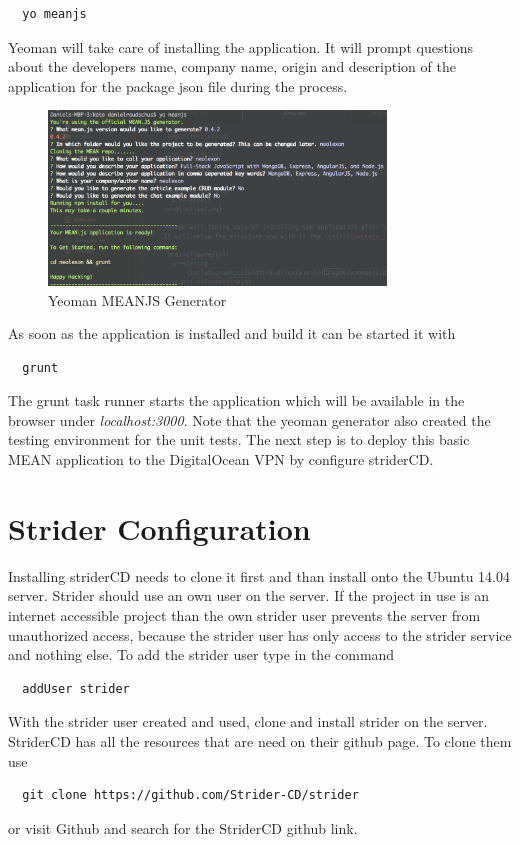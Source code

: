 \begin{lstlisting}
  yo meanjs
\end{lstlisting}

Yeoman will take care of installing the application. It will prompt questions about the developers name, company name, origin and description of the application
for the package json file during the process.

\begin{figure}[h!]
  \centering
  \includegraphics[width=0.8\textwidth]{images/yomean.png}
  \caption{Yeoman MEANJS Generator}
\end{figure}

As soon as the application is installed and build it can be started it with

\begin{lstlisting}
  grunt
\end{lstlisting}

The grunt task runner starts the application which will be available in the browser under \textit{localhost:3000}.
Note that the yeoman generator also created the testing environment for the unit tests. The next step is to deploy this basic MEAN application
to the DigitalOcean VPN by configure striderCD.

\section{Strider Configuration}
\label{section:Strider Configuration}
Installing striderCD needs to clone it first and than install onto the Ubuntu 14.04 server. Strider should use an own user on the server.
If the project in use is an internet accessible project than the own strider user prevents the server from unauthorized access, because
the strider user has only access to the strider service and nothing else. To add the strider user type in the command
\begin{lstlisting}
  addUser strider
\end{lstlisting}
With the strider user created and used, clone and install strider on the server. StriderCD has all the resources that are need on their github page.
To clone them use
\begin{lstlisting}
  git clone https://github.com/Strider-CD/strider
\end{lstlisting}
or visit Github and search for the StriderCD github link.

